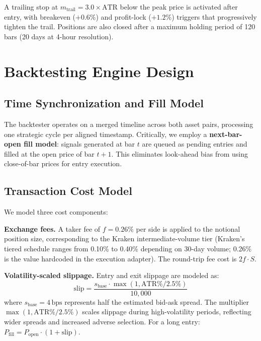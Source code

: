 \documentclass{article}
\newcommand{\bps}{\,\text{bps}}
\begin{document}
A trailing stop at $m_{\text{trail}} = 3.0 \times \text{ATR}$ below the peak price is activated after entry, with breakeven ($+0.6\%$) and profit-lock ($+1.2\%$) triggers that progressively tighten the trail.
Positions are also closed after a maximum holding period of 120 bars (20 days at 4-hour resolution).

\section{Backtesting Engine Design}
\label{sec:backtester}

\subsection{Time Synchronization and Fill Model}

The backtester operates on a merged timeline across both asset pairs, processing one strategic cycle per aligned timestamp.
Critically, we employ a \textbf{next-bar-open fill model}: signals generated at bar $t$ are queued as pending entries and filled at the open price of bar $t+1$.
This eliminates look-ahead bias from using close-of-bar prices for entry execution.

\subsection{Transaction Cost Model}
\label{sec:costs}

We model three cost components:

\textbf{Exchange fees.} A taker fee of $f = 0.26\%$ per side is applied to the notional position size, corresponding to the Kraken intermediate-volume tier (Kraken's tiered schedule ranges from 0.10\% to 0.40\% depending on 30-day volume; 0.26\% is the value hardcoded in the execution adapter).
The round-trip fee cost is $2f \cdot S$.

\textbf{Volatility-scaled slippage.} Entry and exit slippage are modeled as:
\begin{equation}
  \text{slip} = \frac{s_{\text{base}} \cdot \max(1, \text{ATR\%} / 2.5\%)}{10{,}000}
  \label{eq:slippage}
\end{equation}
where $s_{\text{base}} = 4\bps$ represents half the estimated bid-ask spread.
The multiplier $\max(1, \text{ATR\%}/2.5\%)$ scales slippage during high-volatility periods, reflecting wider spreads and increased adverse selection.
For a long entry: $P_{\text{fill}} = P_{\text{open}} \cdot (1 + \text{slip})$.
\end{document}
